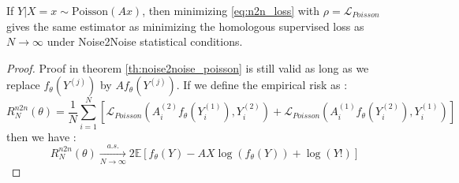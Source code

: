 \begin{theorem}
    If $Y | X=x \sim \text{Poisson}(Ax)$, then minimizing \ref{eq:n2n_loss} with $\rho = \mathcal{L}_{Poisson}$ gives the same estimator as minimizing the homologous supervised loss as $N \to \infty$ under Noise2Noise statistical conditions.
\end{theorem}

\begin{proof}
    Proof in theorem \ref{th:noise2noise_poisson} is still valid as long as we replace $f_{\theta}(Y^{(j)})$ by $A f_{\theta}(Y^{(j)})$. If we define the empirical risk as :
    \begin{equation*}
        R_{N}^{n2n}(\theta) = \frac{1}{N} \sum_{i=1}^N \left[ \mathcal{L}_{Poisson}(A_i^{(2)} f_{\theta}(Y_i^{(1)}), Y_i^{(2)}) + \mathcal{L}_{Poisson}(A_i^{(1)} f_{\theta}(Y_i^{(2)}), Y_i^{(1)}) \right]
    \end{equation*}
    then we have :
    \begin{equation*}
        R_{N}^{n2n}(\theta) \xrightarrow[N \to \infty]{a.s.} 2 \mathbb{E} \left[ f_\theta(Y) - A X \log(f_\theta(Y)) + \log(Y!)\right]
    \end{equation*}
\end{proof}